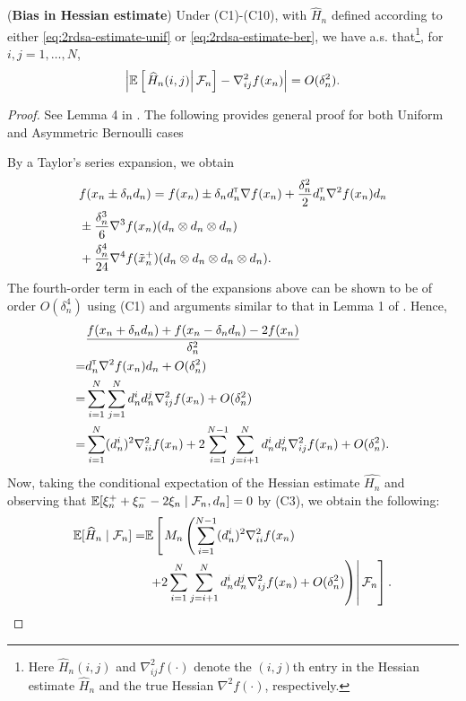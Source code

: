 \begin{lemma}(\textbf{Bias in Hessian estimate})
\label{lemma:2rdsa-bias}
Under (C1)-(C10), with $\widehat H_n$ defined according to either \eqref{eq:2rdsa-estimate-unif} or \eqref{eq:2rdsa-estimate-ber}, we have a.s. that\footnote{Here $\widehat H_n(i,j)$ and $\nabla^2_{ij}f(\cdot)$ denote the $(i,j)$th entry in the Hessian estimate $\widehat H_n$ and the true Hessian $\nabla^2 f(\cdot)$, respectively.}, for $i,j = 1,\ldots,N$,
\begin{align}
\left|\mathbb{E}\left[
\left. \widehat H_n(i,j) \right| \mathcal{F}_n \right] - \nabla^2_{ij} f(x_n)\right| = O(\delta_n^2).
\end{align} 
\end{lemma}
\begin{proof}
See Lemma 4 in \cite{prashanth2015rdsa}. The following provides general proof for both Uniform and Asymmetric Bernoulli cases

By a Taylor's series expansion, we obtain
\begin{align*}
&f(x_n \pm \delta_n d_n) = f(x_n) \pm \delta_n d_n^\mathsf{\scriptscriptstyle T} \nabla f(x_n) + \frac{\delta_n^2}{2} d_n^\mathsf{\scriptscriptstyle T} \nabla^2 f(x_n) d_n \\
&\pm \frac{\delta_n^3}{6} \nabla^3 f(x_n) (d_n \otimes d_n \otimes d_n) \\
 & +  \frac{\delta_n^4}{24} \nabla^4 f(\tilde  x_n^+)(d_n \otimes d_n \otimes d_n \otimes d_n).
\end{align*}
The fourth-order term in each of the expansions above can be shown to be of order $O(\delta_n^4)$ using (C1) and arguments similar to that in Lemma 1 of \cite{prashanth2015rdsa} . Hence,
\begin{align*}
&\dfrac{f(x_n+\delta_n d_n) + f(x_n-\delta_n d_n) - 2 f(x_n)}{\delta_n^2}\\
 =& d_n^\mathsf{\scriptscriptstyle T} \nabla^2 f(x_n) d_n +  O(\delta_n^2)\\
= & \sum\limits_{i=1}^N\sum\limits_{j=1}^N d_n^i d_n^j \nabla^2_{ij} f(x_n) + O(\delta_n^2)\\
=& \sum\limits_{i=1}^N (d_n^i)^2 \nabla^2_{ii} f(x_n) + 2\sum\limits_{i=1}^{N-1}\sum\limits_{j=i+1}^N d_n^i d_n^j \nabla^2_{ij} f(x_n) + O(\delta_n^2).
\end{align*}
Now, taking the conditional expectation of the Hessian estimate $\widehat{H_n}$ and observing that $\mathbb{E}[\xi_n^+ + \xi_n^- - 2\xi_n \mid \mathcal{F}_n, d_n] = 0$ by (C3), we obtain the following:
\begin{align}
\E[\widehat H_n \mid \F_n] = &  \E\left[\left. M_n \left(\sum\limits_{i=1}^{N-1} (d_n^i)^2 \nabla^2_{ii} f(x_n) \right.\right.\right.\nonumber\\
&\left.\left.\left.+ 2\sum\limits_{i=1}^N\sum\limits_{j=i+1}^N d_n^i d_n^j \nabla^2_{ij} f(x_n) + O(\delta_n^2)\right)\right| \F_n\right]. \label{eq:h1}
\end{align}


\end{proof}

